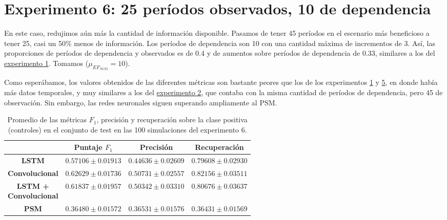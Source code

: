 \documentclass[../../main.tex]{subfiles}
\begin{document}
\section{Experimento 6: 25 períodos observados, 10 de dependencia} \label{sec:exp6} En
este caso, redujimos aún más la cantidad de información disponible. Pasamos de tener 45
períodos en el escenario más beneficioso a tener 25, casi un 50\% menos de información.
Los períodos de dependencia son 10 con una cantidad máxima de incrementos de 3. Así, las
proporciones de períodos de dependencia y observados es de 0.4 y de aumentos sobre
períodos de dependencia de 0.33, similares a los del \hyperref[sec:exp1]{experimento 1}.
Tomamos (\(\mu_{{EF}_{NiNi}} = 10\)).

Como esperábamos, los valores obtenidos de las diferentes métricas son bastante peores que
los de los experimentos \hyperref[sec:exp1]{1} y \hyperref[sec:exp5]{5}, en donde había
más datos temporales, y muy similares a los del \hyperref[sec:exp2]{experimento 2}, que
contaba con la misma cantidad de períodos de dependencia, pero 45 de observación. Sin
embargo, las redes neuronales siguen superando ampliamente al PSM.

\begin{table}[H]
    \centering
    \renewcommand{\arraystretch}{1.2}
    \begin{tabular}{|c|c|c|c|}
        \hline
         & \textbf{Puntaje} \(F_1\) & \textbf{Precisión} & \textbf{Recuperación} \\ \hline\hline
        \textbf{LSTM}
            & $0.57106 \pm 0.01913$ & $0.44636 \pm 0.02609$ & $0.79608 \pm 0.02930$ \\ \hline
        \textbf{Convolucional}
            & $\mathbf{0.62629 \pm 0.01736}$ & $\mathbf{0.50731 \pm 0.02557}$ & $\mathbf{0.82156 \pm 0.03511}$ \\ \hline
        \makecell{\textbf{LSTM +} \\ \textbf{Convolucional}}
            & $0.61837 \pm 0.01957$ & $0.50342 \pm 0.03310$ & $0.80676 \pm 0.03637$ \\ \hline
        \textbf{PSM}
            & $0.36480 \pm 0.01572$ & $0.36531 \pm 0.01576$ & $0.36431 \pm 0.01569$ \\
        \hline
    \end{tabular}
    \caption{Promedio de las métricas \(F_1\), precisión y recuperación sobre la
    clase positiva (controles) en el conjunto de test en las 100 simulaciones del
    experimento 6.}
    \label{tab:results_exp6}
\end{table}
\end{document}
